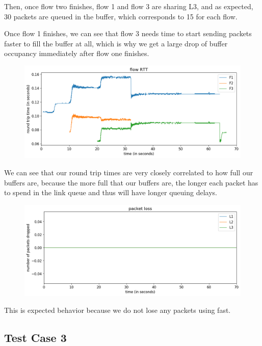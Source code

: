 \documentclass{article}
\begin{document}
Then, once flow two finishes, flow 1 and flow 3 are sharing L3, and as expected, 30 packets are queued in the buffer, which corresponds to 15 for each flow.

Once flow 1 finishes, we can see that flow 3 needs time to start sending packets faster to fill the buffer at all, which is why we get a large drop of buffer occupancy immediately after flow one finishes.

\begin{figure}[H]
\centering
\includegraphics[width = \textwidth]{"test_case2_fast flow RTT"}
\end{figure}

We can see that our round trip times are very closely correlated to how full our buffers are, because the more full that our buffers are, the longer each packet has to spend in the link queue and thus will have longer queuing delays.

\begin{figure}[H]
\centering
\includegraphics[width = \textwidth]{"test_case2_fast packet loss"}
\end{figure}

This is expected behavior because we do not lose any packets using fast.



\subsection{Test Case 3} 
\end{document}
